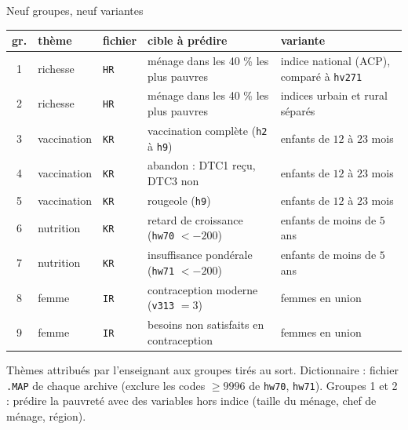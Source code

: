 \documentclass[aspectratio=169,11pt]{beamer}
\begin{document}
\begin{frame}{Neuf groupes, neuf variantes}
  \footnotesize
  \renewcommand{\arraystretch}{1.1}\setlength\tabcolsep{4pt}
  \begin{tabular}{cllp{}p{}}
    \toprule
    \textbf{gr.} & \textbf{thème} & \textbf{fichier} & \textbf{cible à prédire} & \textbf{variante} \\
    \midrule
    1 & richesse & \texttt{HR} & ménage dans les 40 \% les plus pauvres & indice national (ACP), comparé à \texttt{hv271} \\
    2 & richesse & \texttt{HR} & ménage dans les 40 \% les plus pauvres & indices urbain et rural séparés \\
    3 & vaccination & \texttt{KR} & vaccination complète (\texttt{h2} à \texttt{h9}) & enfants de $12$ à $23$ mois \\
    4 & vaccination & \texttt{KR} & abandon : DTC1 reçu, DTC3 non & enfants de $12$ à $23$ mois \\
    5 & vaccination & \texttt{KR} & rougeole (\texttt{h9}) & enfants de $12$ à $23$ mois \\
    6 & nutrition & \texttt{KR} & retard de croissance (\texttt{hw70} $<-200$) & enfants de moins de $5$ ans \\
    7 & nutrition & \texttt{KR} & insuffisance pondérale (\texttt{hw71} $<-200$) & enfants de moins de $5$ ans \\
    8 & femme & \texttt{IR} & contraception moderne (\texttt{v313} $=3$) & femmes en union \\
    9 & femme & \texttt{IR} & besoins non satisfaits en contraception & femmes en union \\
    \bottomrule
  \end{tabular}
  \vskip2mm
  {\footnotesize\color{cnfGris}Thèmes attribués par l'enseignant aux groupes tirés au sort. Dictionnaire : fichier \texttt{.MAP} de chaque archive (exclure les codes $\ge9996$ de \texttt{hw70}, \texttt{hw71}). Groupes 1 et 2 : prédire la pauvreté avec des variables hors indice (taille du ménage, chef de ménage, région).}
\end{frame}
\end{document}
